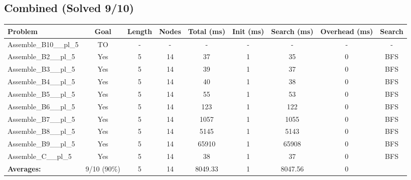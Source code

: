 \documentclass{article}
\begin{document}
\subsection*{Combined (Solved 9/10)}
\begin{tabular}{lcccccccc}
\toprule
Problem & Goal & Length & Nodes & Total (ms) & Init (ms) & Search (ms) & Overhead (ms) & Search \\
\midrule
Assemble\_B10\_\_pl\_5 & TO & - & - & - & - & - & - & - \\
Assemble\_B2\_\_pl\_5 & Yes & 5 & 14 & 37 & 1 & 35 & 0 & BFS \\
Assemble\_B3\_\_pl\_5 & Yes & 5 & 14 & 39 & 1 & 37 & 0 & BFS \\
Assemble\_B4\_\_pl\_5 & Yes & 5 & 14 & 40 & 1 & 38 & 0 & BFS \\
Assemble\_B5\_\_pl\_5 & Yes & 5 & 14 & 55 & 1 & 53 & 0 & BFS \\
Assemble\_B6\_\_pl\_5 & Yes & 5 & 14 & 123 & 1 & 122 & 0 & BFS \\
Assemble\_B7\_\_pl\_5 & Yes & 5 & 14 & 1057 & 1 & 1055 & 0 & BFS \\
Assemble\_B8\_\_pl\_5 & Yes & 5 & 14 & 5145 & 1 & 5143 & 0 & BFS \\
Assemble\_B9\_\_pl\_5 & Yes & 5 & 14 & 65910 & 1 & 65908 & 0 & BFS \\
Assemble\_C\_\_pl\_5 & Yes & 5 & 14 & 38 & 1 & 37 & 0 & BFS \\
\textbf{Averages:} & 9/10 (90\%) & 5 & 14 & 8049.33 & 1 & 8047.56 & 0 & \\
\bottomrule
\end{tabular}
\\[0.7cm]
\end{document}

